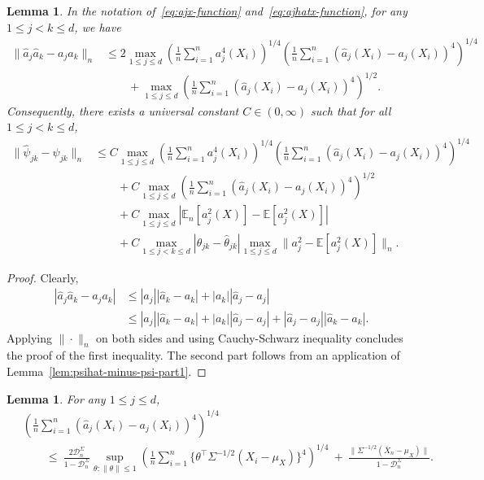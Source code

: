 \documentclass[11pt]{article}
\newtheorem{lemma}[theorem]{Lemma}
\begin{document}
\begin{appendices}
\begin{lemma}\label{lem:psihat-minus-psi-part2}
In the notation of~\eqref{eq:ajx-function} and~\eqref{eq:ajhatx-function}, for any $1\le j < k\le d$, we have
\begin{align*}
\|\widehat{a}_j\widehat{a}_k - a_ja_k\|_n &\le 2\max_{1\le j\le d}\left(\frac{1}{n}\sum_{i=1}^n a_j^4(X_i)\right)^{1/4}\left(\frac{1}{n}\sum_{i=1}^n (\widehat{a}_j(X_i) - a_j(X_i))^4\right)^{1/4}\\
&\qquad+ \max_{1\le j\le d}\left(\frac{1}{n}\sum_{i=1}^n (\widehat{a}_j(X_i) - a_j(X_i))^4\right)^{1/2}.
\end{align*}
Consequently, there exists a universal constant $C\in(0, \infty)$ such that for all $1\le j < k\le d$,
\begin{align*}
\|\widehat{\psi}_{jk} - \psi_{jk}\|_n &\le C\max_{1\le j\le d}\left(\frac{1}{n}\sum_{i=1}^n a_j^4(X_i)\right)^{1/4}\left(\frac{1}{n}\sum_{i=1}^n (\widehat{a}_j(X_i) - a_j(X_i))^4\right)^{1/4}\\
&\qquad+ C\max_{1\le j\le d}\left(\frac{1}{n}\sum_{i=1}^n (\widehat{a}_j(X_i) - a_j(X_i))^4\right)^{1/2}\\
&\qquad+ C\max_{1\le j\le d}|\mathbb{E}_n[a_j^2(X)] - \mathbb{E}[a_j^2(X)]|\\
&\qquad+ C\max_{1\le j < k\le d}|\theta_{jk} - \widehat{\theta}_{jk}|\max_{1\le j\le d}\|a_j^2 - \mathbb{E}[a_j^2(X)]\|_n.
\end{align*}
\end{lemma}
\begin{proof}
Clearly,
\begin{align*}
|\widehat{a}_j\widehat{a}_k - a_j a_k| &\le |\widehat{a}_j||\widehat{a}_k - a_k| + |a_k||\widehat{a}_j - a_j|\\
&\le |a_j||\widehat{a}_k - a_k| + |a_k||\widehat{a}_j - a_j| + |\widehat{a}_j - a_j||\widehat{a}_k - a_k|.
\end{align*}
Applying $\|\cdot\|_n$ on both sides and using Cauchy-Schwarz inequality concludes the proof of the first inequality. The second part follows from an application of Lemma~\ref{lem:psihat-minus-psi-part1}. 
\end{proof}
\begin{lemma}\label{lem:ajhat-minus-aj}
For any $1\le j\le d$,
\begin{align*}
&\left(\frac{1}{n}\sum_{i=1}^n (\widehat{a}_j(X_i) - a_j(X_i))^4\right)^{1/4}\\ ~&\qquad\le~ \frac{2\mathcal{D}_n^{\Sigma}}{1 - \mathcal{D}_n^{\Sigma}}\sup_{\theta:\|\theta\| \le 1}\left(\frac{1}{n}\sum_{i=1}^n {\{\theta^{\top}\Sigma^{-1/2}(X_i - \mu_X)\}^4}\right)^{1/4} ~+~ \frac{\|\Sigma^{-1/2}(\overline{X}_n - \mu_X)\|}{1 - \mathcal{D}_n^{\Sigma}}.

\end{align*}
\end{lemma}
\end{appendices}
\end{document}
